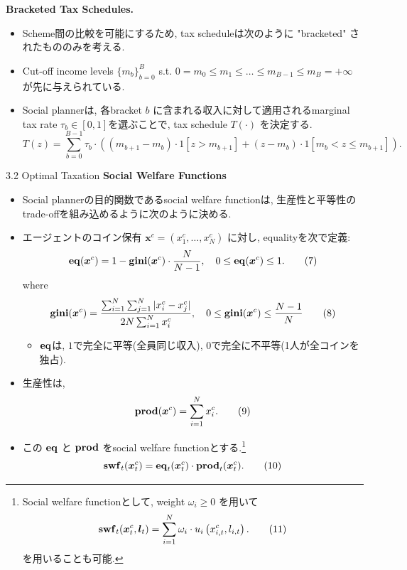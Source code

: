 \documentclass[unicode,aspectratio=169,11pt]{beamer}
\begin{document}
\begin{frame}{}{}
{\bf Bracketed Tax Schedules.}
\begin{itemize}
    \item Scheme間の比較を可能にするため, tax scheduleは次のように "bracketed" されたもののみを考える.
    \item Cut-off income levels $\{m_b\}_{b = 0}^B$ s.t. $0 = m_0 \le m_1 \le \dots \le m_{B-1}\le m_B = +\infty$ が先に与えられている.
    \item Social plannerは, 各bracket $b$ に含まれる収入に対して適用されるmarginal tax rate $\tau_b \in [0,1]$を選ぶことで, tax schedule $T(\cdot)$ を決定する.
    \[ T(z) = \sum_{b = 0}^{B-1} \tau_b \cdot \left((m_{b+1}-m_{b}) \cdot 1[z > m_{b+1}] + (z - m_b)\cdot 1[m_b < z \le m_{b+1}]\right).\]
\end{itemize}
\end{frame}

\begin{frame}{3.2 Optimal Taxation}{}
{\bf Social Welfare Functions}
\begin{itemize}
    \item Social plannerの目的関数であるsocial welfare functionは, 生産性と平等性のtrade-offを組み込めるように次のように決める.
    \item エージェントのコイン保有 $\bm{x}^c = (x_1^c, \dots, x_N^c)$ に対し, equalityを次で定義:
    \[ {\bf{eq}}(\bm{x}^c) = 1 - {\bf{gini}}(\bm{x}^c)\cdot \frac{N}{N-1},\ \ \ 0 \le {\bf eq}(\bm{x}^c)\le 1.\tag{7} \]
    where
    \[ {\bf{gini}}(\bm{x}^c) = \frac{\sum_{i=1}^N\sum_{j=1}^N |x_{i}^c - x_{j}^c|}{2N \sum_{i=1}^N x_{i}^c},
    \ \ \ 0 \le {\bf gini}(\bm{x}^c) \le \frac{N-1}{N}\tag{8} \]
    \begin{itemize}
        \item ${\bf eq}$は, $1$で完全に平等(全員同じ収入), $0$で完全に不平等(1人が全コインを独占).
    \end{itemize}
\end{itemize}
\end{frame}

\begin{frame}{}{}
    \begin{itemize}
        \item 生産性は, 
        \[ {\bf prod}(\bm{x}^c) = \sum_{i=1}^N x_{i}^c. \tag{9} \]
        \item この ${\bf eq}$ と ${\bf prod}$ をsocial welfare functionとする.\footnote{Social welfare functionとして, weight $\omega_i \ge 0$ を用いて
        \[ {\bf swf}_t(\bm{x}_t^c, \bm{l}_t) = \sum_{i = 1}^N \omega_i \cdot u_i\left(x_{i,t}^c, l_{i,t}\right). \tag{11}\]
        を用いることも可能.}
        \[ {\bf swf}_t(\bm{x}_t^c) = {\bf eq}_t(\bm{x}_t^c) \cdot {\bf prod}_t (\bm{x}_t^c). \tag{10}\]
    \end{itemize}
\end{frame}
\end{document}
